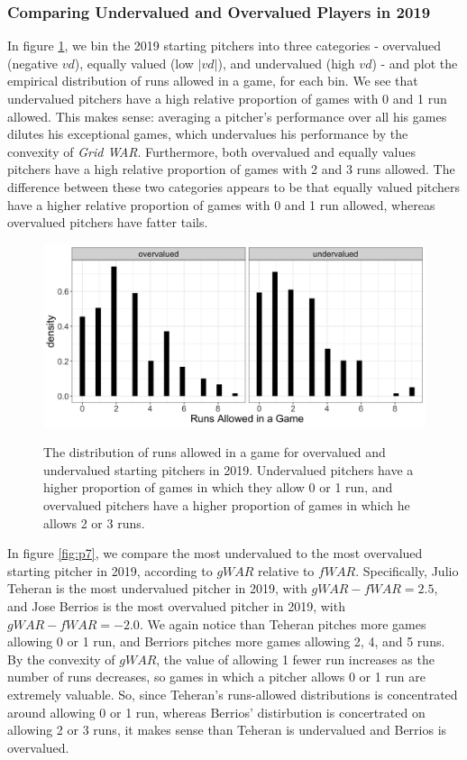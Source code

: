 \documentclass[12pt]{article}
\begin{document}
\subsubsection{Comparing Undervalued and Overvalued Players in 2019}

In figure \ref{fig:cumRunsAggregated19}, we bin the 2019 starting pitchers into three categories - overvalued (negative $vd$), equally valued (low $|vd|$), and undervalued (high $vd$) - and plot the empirical distribution of runs allowed in a game, for each bin. We see that undervalued pitchers have a high relative proportion of games with 0 and 1 run allowed. This makes sense: averaging a pitcher's performance over all his games dilutes his exceptional games, which undervalues his performance by the convexity of \textit{Grid WAR}. Furthermore, both overvalued and equally values pitchers have a high relative proportion of games with 2 and 3 runs allowed. The difference between these two categories appears to be that equally valued pitchers have a higher relative proportion of games with 0 and 1 run allowed, whereas overvalued pitchers have fatter tails.

\begin{figure}[t!]
\centering
\caption{The distribution of runs allowed in a game for overvalued and undervalued starting pitchers in 2019. Undervalued pitchers have a higher proportion of games in which they allow 0 or 1 run, and overvalued pitchers have a higher proportion of games in which he allows 2 or 3 runs.} 
\includegraphics[width=15cm]{../writeup_plots/plot_cumRuns_aggregated_2019.png}
\label{fig:cumRunsAggregated19}
\end{figure}


In figure \ref{fig:p7}, we compare the most undervalued to the most overvalued starting pitcher in 2019, according to $gWAR$ relative to $fWAR$. Specifically, 
Julio Teheran is the most undervalued pitcher in 2019, with $gWAR - fWAR = 2.5$, and Jose Berrios is the most overvalued pitcher in 2019, with $gWAR - fWAR = -2.0$. We again notice than Teheran pitches more games allowing 0 or 1 run, and Berriors pitches more games allowing 2, 4, and 5 runs. By the convexity of $gWAR$, the value of allowing 1 fewer run increases as the number of runs decreases, so games in which a pitcher allows 0 or 1 run are extremely valuable. So, since Teheran's runs-allowed distributions is concentrated around allowing 0 or 1 run, whereas Berrios' distirbution is concertrated on allowing 2 or 3 runs, it makes sense than Teheran is undervalued and Berrios is overvalued. 
\end{document}
